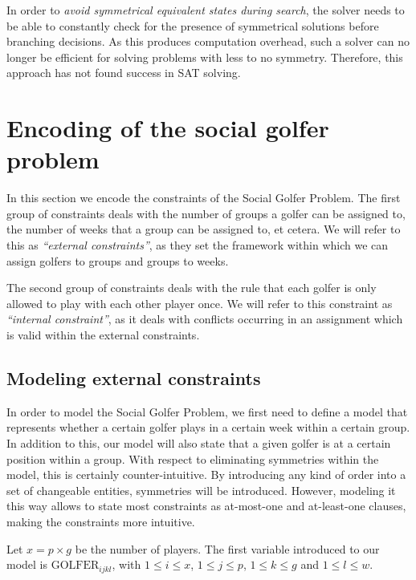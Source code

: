 \documentclass[a4paper]{scrartcl}
\begin{document}
In order to \emph{avoid symmetrical equivalent states during search}, the solver needs to be able to constantly check for the presence of symmetrical solutions before branching decisions. As this produces computation overhead, such a solver can no longer be efficient for solving problems with less to no symmetry. Therefore, this approach has not found success in SAT solving.

\section{Encoding of the social golfer problem}

In this section we encode the constraints of the Social Golfer Problem. The first group of constraints deals with the number of groups a golfer can be assigned to, the number of weeks that a group can be assigned to, et cetera. We will refer to this as \emph{``external constraints''}, as they set the framework within which we can assign golfers to groups and groups to weeks.

The second group of constraints deals with the rule that each golfer is only allowed to play with each other player once. We will refer to this constraint as \emph{``internal constraint''}, as it deals with conflicts occurring in an assignment which is valid within the external constraints.


\subsection{Modeling external constraints}

In order to model the Social Golfer Problem, we first need to define a model that represents whether a certain golfer plays in a certain week within a certain group. In addition to this, our model will also state that a given golfer is at a certain position within a group. With respect to eliminating symmetries within the model, this is certainly counter-intuitive. By introducing any kind of order into a set of changeable entities, symmetries will be introduced. However, modeling it this way allows to state most constraints as at-most-one and at-least-one clauses, making the constraints more intuitive.

Let $x = p \times g$ be the number of players. The first variable introduced to our model is $\text{GOLFER}_{ijkl}$, with $1 \leq i \leq x$, $1 \leq j \leq p$, $1 \leq k \leq g$ and $1 \leq l \leq w$.
\end{document}
